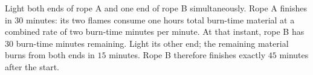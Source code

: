 Light both ends of rope A and one end of rope B simultaneously. Rope A finishes in $30$ minutes: its two flames consume one hour\textquotesingle s total burn-time material at a combined rate of two burn-time minutes per minute. At that instant, rope B has $30$ burn-time minutes remaining. Light its other end; the remaining material burns from both ends in $15$ minutes. Rope B therefore finishes exactly $45$ minutes after the start.
